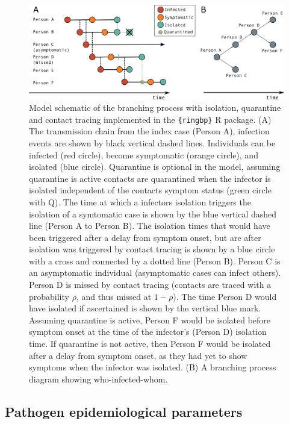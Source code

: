 \documentclass{article}
\begin{document}
\begin{figure}[ht]
\centering
\includegraphics[width=\textwidth]{../plots/model-schematic.png}
\caption{Model schematic of the branching process with isolation, quarantine and contact tracing implemented in the \texttt{\{ringbp\}} R package. (A) The transmission chain from the index case (Person A), infection events are shown by black vertical dashed lines. Individuals can be infected (red circle), become symptomatic (orange circle), and isolated (blue circle). Quarantine is optional in the model, assuming quarantine is active contacts are quarantined when the infector is isolated independent of the contacts symptom status (green circle with Q). The time at which a infectors isolation triggers the isolation of a symtomatic case is shown by the blue vertical dashed line (Person A to Person B). The isolation times that would have been triggered after a delay from symptom onset, but are after isolation was triggered by contact tracing is shown by a blue circle with a cross and connected by a dotted line (Person B). Person C is an asymptomatic individual (asymptomatic cases can infect others). Person D is missed by contact tracing (contacts are traced with a probability $\rho$, and thus missed at $1 - \rho$). The time Person D would have isolated if ascertained is shown by the vertical blue mark. Assuming quarantine is active, Person F would be isolated before symptom onset at the time of the infector's (Person D) isolation time. If quarantine is not active, then Person F would be isolated after a delay from symptom onset, as they had yet to show symptoms when the infector was isolated. (B) A branching process diagram showing who-infected-whom.}
\label{fig:ringbp-model}
\end{figure}

\subsection*{Pathogen epidemiological parameters}
\end{document}
